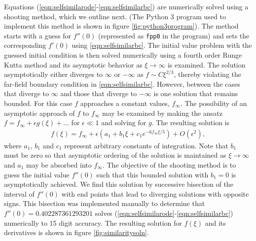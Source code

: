 \documentclass[aps, floatfix, superscriptaddress]{revtex4}
\begin{document}
Equations (\ref{eqn:selfsimilarode}-\ref{eqn:selfsimilarbc}) are numerically solved using a shooting method, which we outline next. 
(The Python 3 program used to implement this method is shown in figure \ref{fig:python3program}).
The method starts with a guess for $f''(0)$ (represented as \texttt{fpp0} in the program) and sets the corresponding $f'(0)$ using \eqref{eqn:selfsimilarbc}.
The initial value problem with the guessed initial condition is then solved numerically using a fourth order Runge Kutta method and its asymptotic behavior as $\xi \to \infty$ is examined. The solution asymptotically either diverges to $\infty$ or $-\infty$ as $f\sim C \xi^{2/3}$, thereby violating the far-field boundary condition in \eqref{eqn:selfsimilarbc}. 
However, between the cases that diverge to $\infty$ and those that diverge to $-\infty$ is one solution that remains bounded.
For this case $f$ approaches a constant values, $f_\infty$.
The possibility of an asymptotic approach of $f$ to $f_\infty$ may be examined by making the ansatz $f = f_\infty + \epsilon g(\xi) + \dots$ for $\epsilon \ll 1$ and solving for $g$.
The resulting solution is
\begin{align}
 f(\xi) = f_\infty + \epsilon \left( a_1 + b_1 \xi + c_1 e^{-6f_\infty \xi/5}  \right) + O(\epsilon^2),
\end{align}
where $a_1$, $b_1$ and $c_1$ represent arbitrary constants of integration.
Note that $b_1$ must be zero so that asymptotic ordering of the solution is maintained as $\xi \to \infty$ and $a_1$ may be absorbed into $f_\infty$.
The objective of the shooting method is to guess the initial value $f''(0)$ such that this bounded solution with $b_1=0$ is asymptotically achieved.
We find this solution by successive bisection of the interval of $f''(0)$ with end points that lead to diverging solutions with opposite signs.
This bisection was implemented manually to determine that $f''(0) = 0.402287361293201$ solves (\ref{eqn:selfsimilarode}-\ref{eqn:selfsimilarbc}) numerically to 15 digit accuracy.
The resulting solution for $f(\xi)$ and its derivatives is shown in figure \ref{fig:similaritysoln}.
\end{document}
